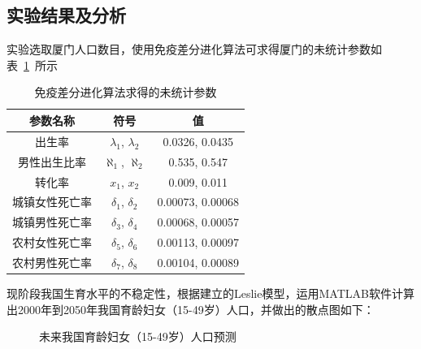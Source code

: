 \documentclass{whutmod}
\begin{document}
        \subsection{实验结果及分析}
        实验选取厦门人口数目，使用免疫差分进化算法可求得厦门的未统计参数如表~\ref{sda}~所示 
		 		\begin{table}[H]
			\centering		
			\caption{免疫差分进化算法求得的未统计参数
			}\label{sda}
			\begin{tabular}{ccc}
				\toprule[2pt]
				\multicolumn{1}{m{4cm}}{\centering 参数名称}
				& \multicolumn{1}{m{3cm}}{\centering 符号}
			& \multicolumn{1}{m{3cm}}{\centering 值}
				\\
				\midrule[1pt]
				出生率 & 	$\lambda_1$, $\lambda_2$&0.0326, 0.0435\\ 
				男性出生比率 &$\aleph_1$, $\aleph_2$&0.535, 0.547\\ 
				转化率 &$x_1$, $x_2$&0.009, 0.011\\
				城镇女性死亡率 &$\delta_1$, $\delta_2$&0.00073, 0.00068\\  
				城镇男性死亡率 &$\delta_3$, $\delta_4$&0.00068, 0.00057\\  
				农村女性死亡率 &$\delta_5$, $\delta_6$&0.00113, 0.00097\\  
				农村男性死亡率 &$\delta_7$, $\delta_8$&0.00104, 0.00089\\  
				\bottomrule[2pt]	
			\end{tabular}
		\end{table}

现阶段我国生育水平的不稳定性，根据建立的Leslie模型，运用MATLAB软件计算出2000年到2050年我国育龄妇女（15-49岁）人口，并做出的散点图如下：
			\begin{figure}[H]	
	\centering
	\caption{未来我国育龄妇女（15-49岁）人口预测 }\label{lssdaddaassct}
	\label{fisg}
\end{figure}
\end{document}
